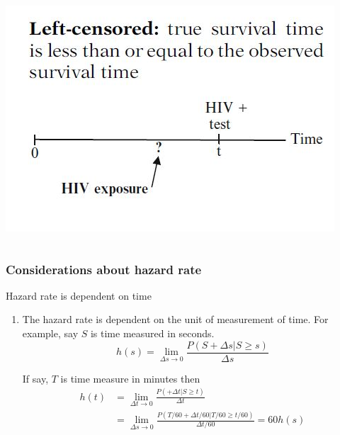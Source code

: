 \documentclass{beamer}
\theoremstyle{definition}
\begin{document}
\begin{frame}
\begin{columns}
\begin{column}{0.48\textwidth}
              \vspace{-20pt}
         \includegraphics[width =\textwidth]{Ch1-LeftCensor.JPG}
    \end{column}
\end{columns}
\end{frame}
\begin{frame} \frametitle{Considerations about hazard rate}
\begin{block}{Hazard rate is dependent on time}
\begin{enumerate}
\item The hazard rate is dependent on the unit of measurement of time. For example, say $S$ is time measured in seconds.
\[
h(s) = \lim_{\Delta s \to 0} \frac{P(S + \Delta s|S \ge s)}{\Delta s}
\]

If say, $T$ is time measure in minutes then
\begin{align*}
h(t) & = \lim_{\Delta t \to 0} \frac{P( + \Delta t|S \ge t)}{\Delta t} \\
& = \lim_{\Delta s \to 0} \frac{P(T/60 + \Delta t/60| T/60 \ge t/60)}{ \Delta t/60} = 60 h(s)
\end{align*}

\end{enumerate}
\end{block}
\end{frame}
\end{document}
